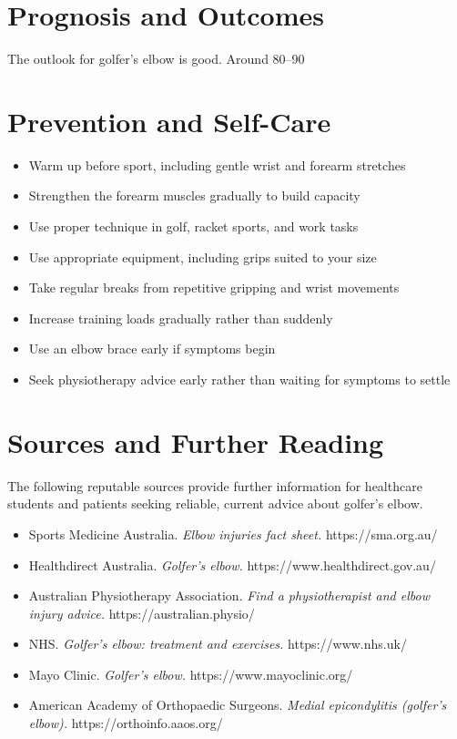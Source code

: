 \section*{Prognosis and Outcomes}
The outlook for golfer's elbow is good. Around 80--90%

\section*{Prevention and Self-Care}
\begin{itemize}
    \item Warm up before sport, including gentle wrist and forearm stretches
    \item Strengthen the forearm muscles gradually to build capacity
    \item Use proper technique in golf, racket sports, and work tasks
    \item Use appropriate equipment, including grips suited to your size
    \item Take regular breaks from repetitive gripping and wrist movements
    \item Increase training loads gradually rather than suddenly
    \item Use an elbow brace early if symptoms begin
    \item Seek physiotherapy advice early rather than waiting for symptoms to settle
\end{itemize}

\section*{Sources and Further Reading}
The following reputable sources provide further information for healthcare students and patients seeking reliable, current advice about golfer's elbow.

\begin{itemize}
    \item Sports Medicine Australia. \textit{Elbow injuries fact sheet.} https://sma.org.au/
    \item Healthdirect Australia. \textit{Golfer's elbow.} https://www.healthdirect.gov.au/
    \item Australian Physiotherapy Association. \textit{Find a physiotherapist and elbow injury advice.} https://australian.physio/
    \item NHS. \textit{Golfer's elbow: treatment and exercises.} https://www.nhs.uk/
    \item Mayo Clinic. \textit{Golfer's elbow.} https://www.mayoclinic.org/
    \item American Academy of Orthopaedic Surgeons. \textit{Medial epicondylitis (golfer's elbow).} https://orthoinfo.aaos.org/
\end{itemize}
